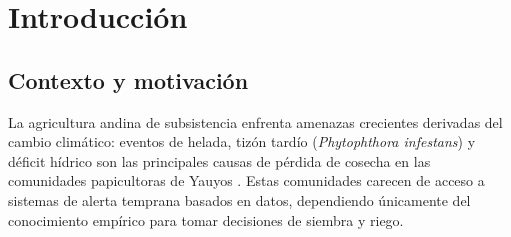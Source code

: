 \documentclass[12pt,a4paper]{article}
\begin{document}
\begin{abstract}
\noindent
El presente informe describe el diseño, implementación y validación de
\textbf{AgroSmart Andino}, un sistema Big Data de monitoreo agroclimático
en tiempo real para el cultivo de papa nativa (\textit{Solanum tuberosum}
spp.) en la localidad de Huangascar, provincia de Yauyos, región Lima, a
3\,200 m.s.n.m. El sistema integra datos climáticos históricos de la
\textbf{NASA POWER API} (10 años, 5 estaciones), telemetría sintética de
\textbf{sensores IoT} (52\,632 registros horarios) y estadísticas
agrícolas del \textbf{MIDAGRI} (1\,500 registros productivos). El pipeline
implementado sobre \textbf{Apache Spark 3.4 en Amazon EMR 6.15} ejecuta
ETL, cálculo de índices agroclimáticos (IHB, ITT, IEH, ET\textsubscript{0})
y modelos de \textit{machine learning} (RandomForest, GBT). La capa de
servicio NoSQL sobre \textbf{Apache Cassandra 4.1} garantiza baja latencia
en la consulta de alertas. El dashboard desarrollado en \textbf{Streamlit}
integra semáforos de riesgo, recomendaciones de riego y predicciones de
rendimiento, mostrando un rendimiento promedio predicho de
\textbf{9.2 t/ha}. El regresor GBT Regressor obtuvo un R\textsuperscript{2} de \textbf{0.6764} y un RMSE de \textbf{0.97 t/ha} en la ejecución real sobre Amazon EMR 6.15.

\medskip
\noindent\textbf{Palabras clave:} Big Data, Apache Spark, Cassandra,
AgTech, papa nativa, ETL, machine learning, dashboard, Huangascar.
\end{abstract}

\newpage
\tableofcontents
\newpage

\section{Introducción}

\subsection{Contexto y motivación}

La agricultura andina de subsistencia enfrenta amenazas crecientes
derivadas del cambio climático: eventos de helada, tizón tardío
(\textit{Phytophthora infestans}) y déficit hídrico son las principales
causas de pérdida de cosecha en las comunidades papicultoras de Yauyos
\cite{midagri2023}. Estas comunidades carecen de acceso a sistemas de
alerta temprana basados en datos, dependiendo únicamente del conocimiento
empírico para tomar decisiones de siembra y riego.
\end{document}
